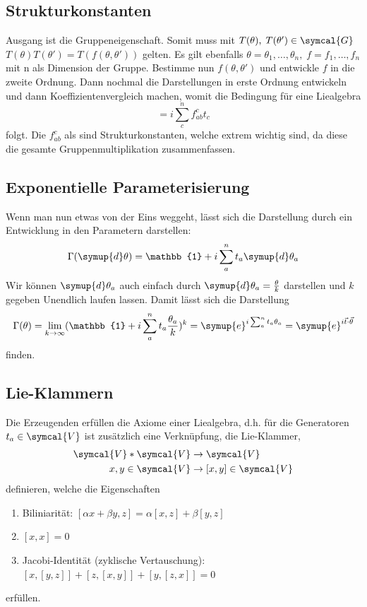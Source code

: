 \documentclass[
  captions=tableheading,  %
  titlepage=firstiscover, %
]{scrartcl}
\begin{document}
\subsection{Strukturkonstanten}
Ausgang ist die Gruppeneigenschaft. 
Somit muss mit $T(\theta), \; T(\theta') \in \symcal{G}$ $T(\theta)T(\theta') = T(f(\theta, \theta'))$ gelten.
Es gilt ebenfalls $\theta = \theta_1, \ldots, \theta_n, \; f = f_1, \ldots, f_n$ mit n als Dimension der Gruppe.
Bestimme nun $f(\theta, \theta')$ und entwickle $f$ in die zweite Ordnung.
Dann nochmal die Darstellungen in erste Ordnung entwickeln und dann Koeffizientenvergleich machen, womit 
die Bedingung für eine Liealgebra
\begin{equation*}
  [t_a, t_b] = i \sum_c^n f_{ab}^ct_c
\end{equation*}
folgt. 
Die $f_{ab}^c$ als sind Strukturkonstanten,
welche extrem wichtig sind, da diese die gesamte Gruppenmultiplikation zusammenfassen.
\subsection{Exponentielle Parameterisierung}
\label{sub:exp}
Wenn man nun etwas von der Eins weggeht, lässt sich die Darstellung durch 
ein Entwicklung in den Parametern darstellen:
\begin{equation*}
  \Gamma(\symup{d}\theta) = \mathbb{1} + i \sum_a^n t_a \symup{d}\theta_a 
\end{equation*}
Wir können $\symup{d}\theta_a$ auch einfach durch $\symup{d}\theta_a = \frac{\theta}{k}$ darstellen und $k$ gegeben
Unendlich laufen lassen.
Damit lässt sich die Darstellung
\begin{equation*}
  \Gamma(\theta) = \lim_{k \to \infty} (\mathbb{1} + i \sum_a^n t_a \frac{\theta_a}{k})^k = \symup{e}^{i\sum_a^n t_a \theta_a}
  = \symup{e}^{i\vec{t} \cdot \vec{\theta}}
\end{equation*}
finden.
\subsection{Lie-Klammern}
Die Erzeugenden erfüllen die Axiome einer Liealgebra, d.h. für die Generatoren $t_a \in \symcal{V}$ ist 
zusätzlich eine Verknüpfung, die Lie-Klammer, 
\begin{align*}
  \symcal{V} * \symcal{V} &\to \symcal{V} \\
  x,y \in \symcal{V}      &\to [x,y] \in \symcal{V}
\end{align*}
definieren, welche die Eigenschaften 
\begin{enumerate}
  \item Biliniarität: $[\alpha x + \beta y, z] = \alpha [x,z] + \beta [y,z]$
  \item $[x,x] = 0$
  \item Jacobi-Identität (zyklische Vertauschung): $[x, [y,z]] + [z,[x,y]] + [y,[z,x]] = 0$
\end{enumerate}
erfüllen.
\end{document}
